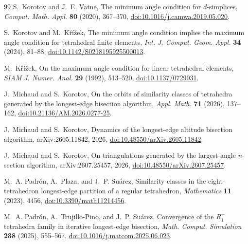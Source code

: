 \documentclass[10pt]{article}
\theoremstyle{definition}
\begin{document}
\begin{thebibliography}{99}
S.~Korotov and J.~E. Vatne,
\newblock The minimum angle condition for $d$-simplices,
\newblock \emph{Comput. Math. Appl.} \textbf{80} (2020), 367--370,
\newblock \href{https://doi.org/10.1016/j.camwa.2019.05.020}{doi:10.1016/j.camwa.2019.05.020}.

S.~Korotov and M.~K\v{r}\'i\v{z}ek,
\newblock The minimum angle condition implies the maximum angle condition for tetrahedral finite elements,
\newblock \emph{Int. J. Comput. Geom. Appl.} \textbf{34} (2024), 81--88,
\newblock \href{https://doi.org/10.1142/S0218195925500013}{doi:10.1142/S0218195925500013}.

M.~K\v{r}\'i\v{z}ek,
\newblock On the maximum angle condition for linear tetrahedral elements,
\newblock \emph{SIAM J. Numer. Anal.} \textbf{29} (1992), 513--520,
\newblock \href{https://doi.org/10.1137/0729031}{doi:10.1137/0729031}.

J.~Michaud and S.~Korotov,
\newblock On the orbits of similarity classes of tetrahedra generated by the longest-edge bisection algorithm,
\newblock \emph{Appl. Math.} \textbf{71} (2026), 137--162,
\newblock \href{https://doi.org/10.21136/AM.2026.0277-25}{doi:10.21136/AM.2026.0277-25}.

J.~Michaud and S.~Korotov,
\newblock Dynamics of the longest-edge altitude bisection algorithm,
\newblock arXiv:2605.11842, 2026,
\newblock \href{https://doi.org/10.48550/arXiv.2605.11842}{doi:10.48550/arXiv.2605.11842}.

J.~Michaud and S.~Korotov,
\newblock On triangulations generated by the largest-angle $n$-section algorithm,
\newblock arXiv:2607.25457, 2026,
\newblock \href{https://doi.org/10.48550/arXiv.2607.25457}{doi:10.48550/arXiv.2607.25457}.

M.~A. Padr\'on, A.~Plaza, and J.~P. Su\'arez,
\newblock Similarity classes in the eight-tetrahedron longest-edge partition of a regular tetrahedron,
\newblock \emph{Mathematics} \textbf{11} (2023), 4456,
\newblock \href{https://doi.org/10.3390/math11214456}{doi:10.3390/math11214456}.

M.~A. Padr\'on, A.~Trujillo-Pino, and J.~P. Su\'arez,
\newblock Convergence of the $R_1^+$ tetrahedra family in iterative longest-edge bisection,
\newblock \emph{Math. Comput. Simulation} \textbf{238} (2025), 555--567,
\newblock \href{https://doi.org/10.1016/j.matcom.2025.06.023}{doi:10.1016/j.matcom.2025.06.023}.


\end{thebibliography}
\end{document}
